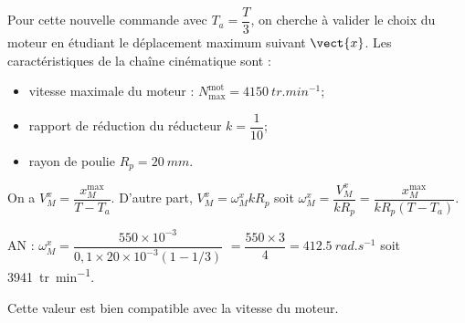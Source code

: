 \else
\fi

\ifprof
\else
Pour cette nouvelle commande avec $T_a=\dfrac{T}{3}$, on cherche à valider le choix du moteur en étudiant le
déplacement maximum suivant $\vect{x}$. Les caractéristiques de la chaîne cinématique sont :
\begin{itemize}
\item vitesse maximale du moteur : $N_{\text{max}}^{\text{mot}}=\SI{4150}{tr.min^{-1}}$;
\item rapport de réduction du réducteur $k=\dfrac{1}{10}$;
\item rayon de poulie $R_p= \SI{20}{mm}$.
\end{itemize}
\fi

\ifprof
On a  $V_M^x=\dfrac{x_M^{\text{max}}}{T-T_a}$. D'autre part, 
$V_M^x = \omega_M^x  k R_p $ soit $\omega_M^x  = \dfrac{V_M^x}{ k R_p} =  \dfrac{{x_M^{\text{max}}}}{ k R_p\left({T-T_a} \right)} $.

AN : $\omega_M^x  = \dfrac{550\times 10^{-3}}{ 0,1 \times 20 \times 10^{-3} \left(1-1/3 \right)} $
$ =  \dfrac{550\times 3}{ 4}= \SI{412,5}{rad.s^{-1}} $ soit \SI{3941}{tr.min^{-1}}.

Cette valeur est bien compatible avec la vitesse du moteur.
\else
\fi

\ifprof
\else
{}
\fi